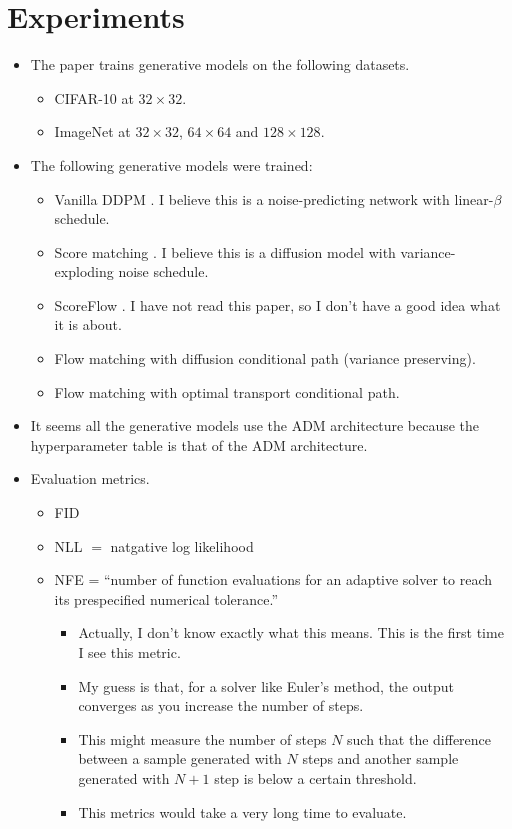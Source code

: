 \documentclass[10pt]{article}
\begin{document}
\section{Experiments}

\begin{itemize}
  \item The paper trains generative models on the following datasets.
  \begin{itemize}
    \item CIFAR-10 at $32\times32$.
    \item ImageNet at $32 \times 32$, $64 \times 64$ and $128 \times 128$.
  \end{itemize}
  
  \item The following generative models were trained:
  \begin{itemize}
    \item Vanilla DDPM \cite{Ho:2020}. I believe this is a noise-predicting network with linear-$\beta$ schedule.
    \item Score matching \cite{Song:SDE:2021}. I believe this is a diffusion model with variance-exploding noise schedule.
    \item ScoreFlow \cite{Song:ScoreFlow:2021}. I have not read this paper, so I don't have a good idea what it is about.
    \item Flow matching with diffusion conditional path (variance preserving).
    \item Flow matching with optimal transport conditional path.
  \end{itemize}

  \item It seems all the generative models use the ADM architecture because the hyperparameter table is that of the ADM architecture.
  
  \item Evaluation metrics.
  \begin{itemize}
    \item FID
    \item NLL $=$ natgative log likelihood
    \item NFE = ``number of function evaluations for an adaptive solver to reach its prespecified numerical tolerance.''
    \begin{itemize}
      \item Actually, I don't know exactly what this means. This is the first time I see this metric.
      \item My guess is that, for a solver like Euler's method, the output converges as you increase the number of steps.
      \item This might measure the number of steps $N$ such that the difference between a sample generated with $N$ steps and another sample generated with $N+1$ step is below a certain threshold.
      \item This metrics would take a very long time to evaluate.
    \end{itemize}
  \end{itemize}


\end{itemize}
\end{document}
